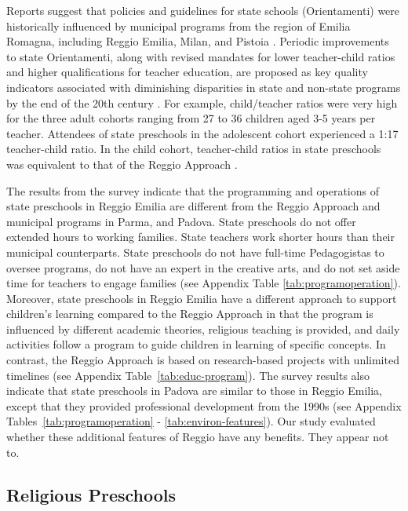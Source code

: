 Reports suggest that policies and guidelines for state schools (Orientamenti) were historically influenced by municipal programs from the region of Emilia Romagna, including Reggio Emilia, Milan, and Pistoia \citep{OECD_2001_Italy-Country-Note}. Periodic improvements to state Orientamenti, along with revised mandates for lower teacher-child ratios and higher qualifications for teacher education, are proposed as key quality indicators associated with diminishing disparities in state and non-state programs by the end of the 20th century \citep{Hohnerlein_2015_Development-and-Diffusion}. For example, child/teacher ratios were very high for the three adult cohorts ranging from 27 to 36 children aged 3-5 years per teacher. Attendees of state preschools in the adolescent cohort experienced a 1:17 teacher-child ratio. In the child cohort, teacher-child ratios in state preschools was equivalent to that of the Reggio Approach \citep{Hohnerlein_2015_Development-and-Diffusion}.

The results from the survey indicate that the programming and operations of state preschools in Reggio Emilia are different from the Reggio Approach and municipal programs in Parma, and Padova. State preschools do not offer extended hours to working families. State teachers work shorter hours than their municipal counterparts. State preschools do not have full-time Pedagogistas to oversee programs, do not have an expert in the creative arts, and do not set aside time for teachers to engage families (see Appendix Table \ref{tab:programoperation}). Moreover, state preschools in Reggio Emilia have a different approach to support children's learning compared to the Reggio Approach in that the program is  influenced by different academic theories, religious teaching is provided, and daily activities follow a program to guide children in learning of specific concepts. In contrast, the Reggio Approach is based on research-based projects with unlimited timelines (see Appendix Table~\ref{tab:educ-program}). The survey results also indicate that state preschools in Padova are similar to those in Reggio Emilia, except that they provided professional development from the 1990s (see Appendix Tables~\ref{tab:programoperation} - \ref{tab:environ-features}). Our study evaluated whether these additional features of Reggio have any benefits. They appear not to.

\subsection{Religious Preschools}

